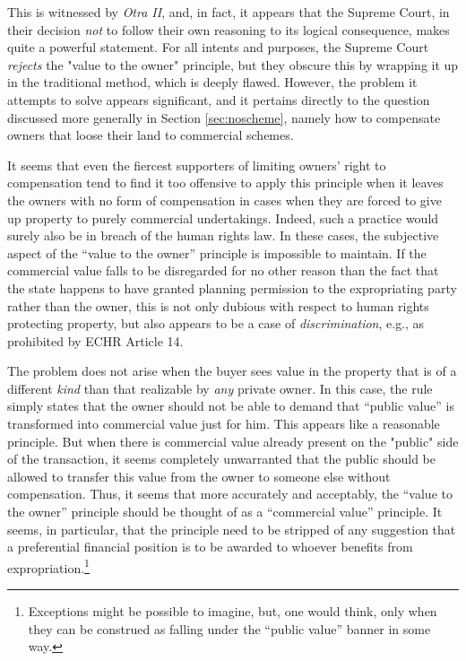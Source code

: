 This is witnessed by \emph{Otra II}, and, in fact, it appears that the Supreme Court, in their decision  \emph{not} to follow their own reasoning to its logical consequence, makes quite a powerful statement. For all intents and purposes, the Supreme Court \emph{rejects} the "value to the owner" principle, but they obscure this by wrapping it up in the traditional method, which is deeply flawed. However, the problem it attempts to solve appears significant, and it pertains directly to the question discussed more generally in Section \ref{sec:noscheme}, namely how to compensate owners that loose their land to commercial schemes. 

It seems that even the fiercest supporters of limiting owners' right to compensation tend to find it too offensive to apply this principle when it leaves the owners with no form of compensation in cases when they are forced to give up property to purely commercial undertakings. Indeed, such a practice would surely also be in breach of the human rights law. In these cases, the subjective aspect of the ``value to the owner'' principle is impossible to maintain. If the commercial value falls to be disregarded for no other reason than the fact that the state happens to have granted planning permission to the expropriating party rather than the owner, this is not only dubious with respect to human rights protecting property, but also appears to be a case of \emph{discrimination}, e.g., as prohibited by ECHR Article 14.

The problem does not arise when the buyer sees value in the property that is of a different \emph{kind} than that realizable by \emph{any} private owner. In this case, the rule simply states that the owner should not be able to demand that ``public value'' is transformed into commercial value just for him. This appears like a reasonable principle. But when there is commercial value already present on the "public" side of the transaction, it seems completely unwarranted that the public should be allowed to transfer this value from the owner to someone else without compensation. Thus, it seems that more accurately and acceptably, the ``value to the owner'' principle should be thought of as a ``commercial value'' principle. It seems, in particular, that the principle need to be stripped of any suggestion that a preferential financial position is to be awarded to whoever benefits from expropriation.\footnote{Exceptions might be possible to imagine, but, one would think, only when they can be construed as falling under the ``public value'' banner in some way.}


